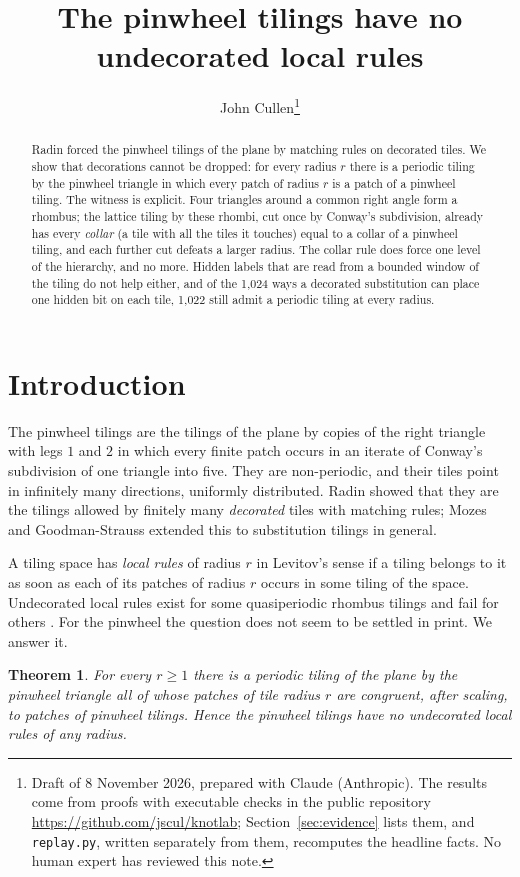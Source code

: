 \documentclass[11pt]{article}
\title{The pinwheel tilings have no undecorated local rules}
\author{John Cullen\thanks{Draft of 8 November 2026, prepared with Claude
(Anthropic). The results come from proofs with executable checks in the
public repository \url{https://github.com/jscul/knotlab}; Section~\ref{sec:evidence}
lists them, and \texttt{replay.py}, written separately from them, recomputes the
headline facts. No human expert has reviewed this note.}}
\date{}
\newtheorem{theorem}{Theorem}
\theoremstyle{definition}
\theoremstyle{remark}
\begin{document}
\maketitle

\begin{abstract}
Radin forced the pinwheel tilings of the plane by matching rules on decorated
tiles. We show that decorations cannot be dropped: for every radius $r$ there is
a periodic tiling by the pinwheel triangle in which every patch of radius $r$ is
a patch of a pinwheel tiling. The witness is explicit. Four triangles around a
common right angle form a rhombus; the lattice tiling by these rhombi, cut once
by Conway's subdivision, already has every \emph{collar} (a tile with all the
tiles it touches) equal to a collar of a pinwheel tiling, and each further cut
defeats a larger radius. The collar rule does force one level of the hierarchy,
and no more. Hidden labels that are read from a bounded window of the tiling do
not help either, and of the 1{,}024 ways a decorated substitution can place one
hidden bit on each tile, 1{,}022 still admit a periodic tiling at every radius.
\end{abstract}

\section{Introduction}

The pinwheel tilings \cite{Rad94} are the tilings of the plane by copies of the
right triangle with legs $1$ and $2$ in which every finite patch occurs in an
iterate of Conway's subdivision of one triangle into five. They are
non-periodic, and their tiles point in infinitely many directions, uniformly
distributed. Radin showed that they are the tilings allowed by finitely many
\emph{decorated} tiles with matching rules; Mozes \cite{Moz89} and
Goodman-Strauss \cite{GS98} extended this to substitution tilings in general.

A tiling space has \emph{local rules} of radius $r$ in Levitov's sense
\cite{Lev88} if a tiling belongs to it as soon as each of its patches of radius
$r$ occurs in some tiling of the space. Undecorated local rules exist for some
quasiperiodic rhombus tilings and fail for others \cite{Lev88,Soc90}. For the
pinwheel the question does not seem to be settled in print. We answer it.

\begin{theorem}\label{thm:main}
For every $r\ge 1$ there is a periodic tiling of the plane by the pinwheel
triangle all of whose patches of tile radius $r$ are congruent, after scaling,
to patches of pinwheel tilings. Hence the pinwheel tilings have no undecorated
local rules of any radius.
\end{theorem}
\end{document}
